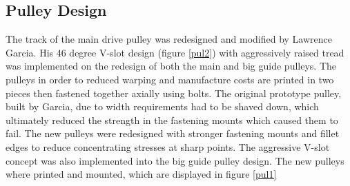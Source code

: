 \documentclass[paper=a4, fontsize=11pt]{scrartcl}
\numberwithin{equation}{section}		%
\numberwithin{figure}{section}			%
\numberwithin{table}{section}				%
\begin{document}
\subsection{Pulley Design}
The track of the main drive pulley was redesigned and modified by Lawrence Garcia. His 46 degree V-slot design (figure \ref{pul2}) with aggressively raised tread was implemented on the redesign of both the main and big guide pulleys. The pulleys in order to reduced warping and manufacture costs are printed in two pieces then fastened together axially using bolts. The original prototype pulley, built by Garcia, due to width requirements had to be shaved down, which ultimately reduced the strength in the fastening mounts which caused them to fail. The new pulleys were redesigned with stronger fastening mounts and fillet edges to reduce concentrating stresses at sharp points. The aggressive V-slot concept was also implemented into the big guide pulley design. The new pulleys where printed and mounted, which are displayed in figure \ref{pul1}
\end{document}
